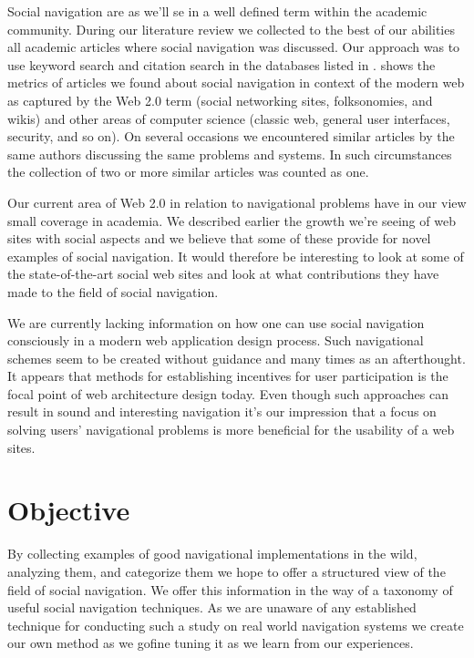 Social navigation are as we'll se in
a well defined term within the academic community.
During our literature review we collected to the best of our abilities all
academic articles where social navigation was discussed. Our approach was to
use keyword search and citation search in the databases listed in
.%
 shows the metrics of articles
we found about social navigation in context of the modern web as captured by
the Web 2.0 term (social networking sites, folksonomies, and wikis) and other
areas of computer science (classic web, general user interfaces, security, and
so on).
On several occasions we encountered similar articles by the same authors
discussing the same problems and systems. In such circumstances the collection
of two or more similar articles was counted as one.

Our current area of Web 2.0 in relation to navigational problems have in our
view small coverage in academia.
We described earlier the growth we're seeing of web sites with social
aspects and we believe that some of these provide for novel examples of social
navigation. It would therefore be interesting to look at some of the
state-of-the-art social web sites and look at what contributions they have
made to the field of social navigation.

We are currently lacking information on how one can use social navigation
consciously in a modern web application design process. Such navigational
schemes seem to be created without guidance and many times as an afterthought.
It appears that methods for establishing incentives for user participation
is the focal point of web architecture design today. Even though such
approaches can result in sound and interesting navigation it's our impression
that a focus on solving users' navigational problems is more beneficial for
the usability of a web sites.

\section{Objective}

By collecting examples of good navigational implementations in the wild,
analyzing them, and categorize them we hope to offer a structured view of the
field of social navigation. We offer this information in the way of a taxonomy
of useful social navigation techniques.
As we are unaware of any established technique for
conducting such a study on real world navigation systems we create our own
method as we go\dash{}fine tuning it as we learn from our experiences.

